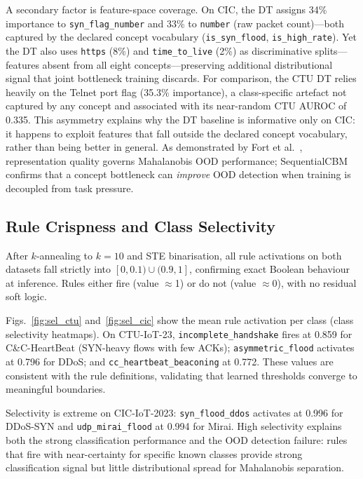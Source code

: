 \documentclass[conference]{IEEEtran}
\begin{document}
A secondary factor is feature-space coverage. On CIC, the DT assigns
34\% importance to \texttt{syn\_flag\_number} and 33\% to
\texttt{number} (raw packet count)---both captured by the declared
concept vocabulary (\texttt{is\_syn\_flood}, \texttt{is\_high\_rate}).
Yet the DT also uses \texttt{https} (8\%) and \texttt{time\_to\_live}
(2\%) as discriminative splits---features absent from all eight
concepts---preserving additional distributional signal that joint
bottleneck training discards. For comparison, the CTU DT relies heavily
on the Telnet port flag (35.3\% importance), a class-specific artefact
not captured by any concept and associated with its near-random CTU
AUROC of 0.335. This asymmetry explains why the DT baseline is
informative only on CIC: it happens to exploit features that fall
outside the declared concept vocabulary, rather than being better
in general. As demonstrated by Fort et al.~\cite{fort2021exploring},
representation quality governs Mahalanobis OOD performance; SequentialCBM
confirms that a concept bottleneck can \emph{improve} OOD detection
when training is decoupled from task pressure.

\subsection{Rule Crispness and Class Selectivity}

After $k$-annealing to $k{=}10$ and STE binarisation, all rule
activations on both datasets fall strictly into $[0,0.1)\cup(0.9,1]$,
confirming exact Boolean behaviour at inference. Rules either fire
(value $\approx$1) or do not (value $\approx$0), with no residual soft
logic.

\begin{sloppypar}
Figs.~\ref{fig:sel_ctu} and~\ref{fig:sel_cic} show the mean rule
activation per class (class selectivity heatmaps). On CTU-IoT-23,
\texttt{incomplete\_handshake} fires at 0.859 for C\&C-HeartBeat
(SYN-heavy flows with few ACKs); \texttt{asymmetric\_flood} activates
at 0.796 for DDoS; and \texttt{cc\_heartbeat\_beaconing} at 0.772.
These values are consistent with the rule definitions,
validating that learned thresholds converge to meaningful boundaries.

Selectivity is extreme on CIC-IoT-2023: \texttt{syn\_flood\_ddos}
activates at 0.996 for DDoS-SYN and \texttt{udp\_mirai\_flood} at
0.994 for Mirai. High selectivity explains both the strong
classification performance and the OOD detection failure: rules that
fire with near-certainty for specific known classes provide strong
classification signal but little distributional spread for Mahalanobis
separation.
\end{sloppypar}
\end{document}
